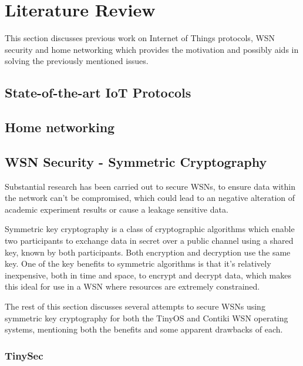 \documentclass{mprop}
\begin{document}

\section{Literature Review}
This section discusses previous work on Internet of Things protocols, WSN security and home networking which provides the motivation and possibly aids in solving the previously mentioned issues.

\subsection{State-of-the-art IoT Protocols} %
\label{sub:state_of_the_art_iot_protocols}


\subsection{Home networking} %
\label{sub:homework_smart_home_router}


\subsection{WSN Security - Symmetric Cryptography} %
\label{sub:tinysec_minisec_contikisec}
Substantial research has been carried out to secure WSNs, to ensure data within the network can't be compromised, which could lead to an negative alteration of academic experiment results or cause a leakage sensitive data. 

Symmetric key cryptography is a class of cryptographic algorithms which enable two participants to exchange data in secret over a public channel using a shared key, known by both participants. Both encryption and decryption use the same key. One of the key benefits to symmetric algorithms is that it's relatively inexpensive, both in time and space, to encrypt and decrypt data, which makes this ideal for use in a WSN where resources are extremely constrained.

The rest of this section discusses several attempts to secure WSNs using symmetric key cryptography for both the TinyOS and Contiki WSN operating systems, mentioning both the benefits and some apparent drawbacks of each. 


\subsubsection{TinySec} %
\label{ssub:tinysec}

\end{document}
